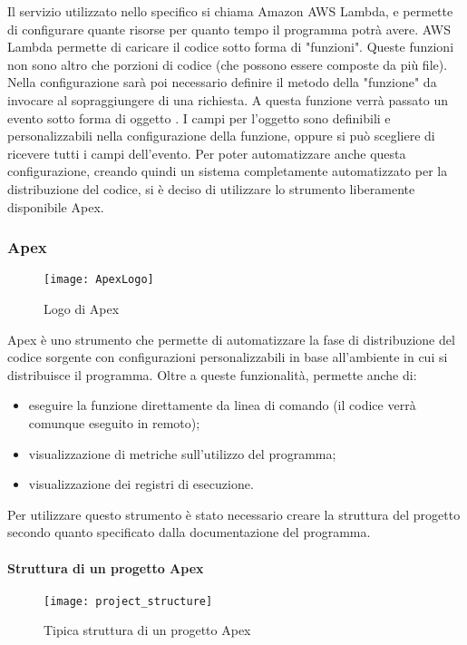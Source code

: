 Il servizio  utilizzato nello specifico si chiama Amazon
AWS Lambda, e permette di configurare quante risorse per quanto tempo il
programma potrà avere.
AWS Lambda permette di caricare il codice sotto forma di "funzioni". Queste
funzioni non sono altro che porzioni di codice (che possono essere composte da
più file).
Nella configurazione sarà poi necessario definire il metodo della
"funzione" da invocare al sopraggiungere di una richiesta. A questa funzione
verrà passato un evento sotto forma di oggetto
. I campi per l'oggetto sono
definibili e personalizzabili nella configurazione della funzione, oppure si può
scegliere di ricevere tutti i campi dell'evento.
Per poter automatizzare anche questa configurazione, creando
quindi un sistema completamente automatizzato per la distribuzione del
codice, si è deciso di utilizzare lo strumento liberamente disponibile Apex.

\subsubsection{Apex}
\begin{figure}[H]
  \centering
  \texttt{[image: ApexLogo]}
  \caption{Logo di Apex}
\end{figure}

Apex è uno strumento che permette di automatizzare la fase di distribuzione del
codice sorgente con configurazioni personalizzabili in base all'ambiente in cui
si distribuisce il programma. Oltre a queste funzionalità, permette anche di:
\begin{itemize}
  \item eseguire la funzione direttamente da linea di comando (il codice verrà
comunque eseguito in remoto);
  \item visualizzazione di metriche sull'utilizzo del programma;
  \item visualizzazione dei registri di esecuzione.
\end{itemize}

Per utilizzare questo strumento è stato necessario creare la struttura del
progetto secondo quanto specificato dalla documentazione del programma.

\paragraph*{Struttura di un progetto Apex}

\begin{figure}[H]
  \centering
  \texttt{[image: project\_structure]}
  \caption{Tipica struttura di un progetto Apex}
\end{figure}

